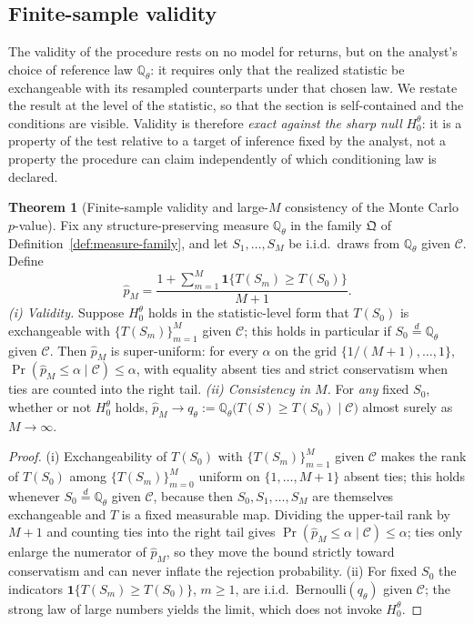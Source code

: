 \documentclass[preprint,12pt]{elsarticle}
\theoremstyle{definition}
\newtheorem{theorem}{Theorem}
\begin{document}
\subsection{Finite-sample validity}
\label{sec:fs-validity}

The validity of the procedure rests on no model for returns, but on the
analyst's choice of reference law $\mathbb{Q}_\theta$: it requires only that the
realized statistic be exchangeable with its resampled counterparts under that
chosen law. We restate the result at the level of the statistic, so that the
section is self-contained and the conditions are visible. Validity is therefore
\emph{exact against the sharp null} $H_0^\theta$: it is a property of the test
relative to a target of inference fixed by the analyst, not a property the
procedure can claim independently of which conditioning law is declared.

\begin{theorem}[Finite-sample validity and large-$M$ consistency of the
Monte Carlo $p$-value]
\label{prop:q-validity}
Fix any structure-preserving measure $\mathbb{Q}_\theta$ in the family
$\mathfrak Q$ of Definition~\ref{def:measure-family}, and let $S_1,\dots,S_M$ be
i.i.d.\ draws from $\mathbb{Q}_\theta$ given $\mathcal C$.
Define
\[
\hat p_M
=\frac{1+\sum_{m=1}^{M}\mathbf 1\{T(S_m)\ge T(S_0)\}}{M+1}.
\]
\emph{(i) Validity.} Suppose $H_0^\theta$ holds in the statistic-level form that
$T(S_0)$ is exchangeable with $\{T(S_m)\}_{m=1}^{M}$ given $\mathcal C$; this
holds in particular if $S_0\stackrel{d}{=}\mathbb{Q}_\theta$ given $\mathcal C$.
Then $\hat p_M$ is super-uniform: for every $\alpha$ on the grid
$\{1/(M+1),\dots,1\}$, $\Pr(\hat p_M\le\alpha\mid\mathcal C)\le\alpha$, with
equality absent ties and strict conservatism when ties are counted into the
right tail.
\emph{(ii) Consistency in $M$.} For \emph{any} fixed $S_0$, whether or not
$H_0^\theta$ holds, $\hat p_M\to q_\theta:=\mathbb{Q}_\theta\big(T(S)\ge
T(S_0)\mid\mathcal C\big)$ almost surely as $M\to\infty$.
\end{theorem}

\begin{proof}
(i) Exchangeability of $T(S_0)$ with $\{T(S_m)\}_{m=1}^{M}$ given $\mathcal C$
makes the rank of $T(S_0)$ among $\{T(S_m)\}_{m=0}^{M}$ uniform on
$\{1,\dots,M+1\}$ absent ties; this holds whenever $S_0\stackrel{d}{=}
\mathbb{Q}_\theta$ given $\mathcal C$, because then $S_0,S_1,\dots,S_M$ are
themselves exchangeable and $T$ is a fixed measurable map. Dividing the
upper-tail rank by $M+1$ and counting ties into the right tail gives
$\Pr(\hat p_M\le\alpha\mid\mathcal C)\le\alpha$; ties only enlarge the numerator
of $\hat p_M$, so they move the bound strictly toward conservatism and can never
inflate the rejection probability. (ii) For fixed $S_0$ the indicators
$\mathbf 1\{T(S_m)\ge T(S_0)\}$, $m\ge1$, are i.i.d.\ Bernoulli$(q_\theta)$
given $\mathcal C$; the strong law of large numbers yields the limit, which does
not invoke $H_0^\theta$.
\end{proof}
\end{document}
